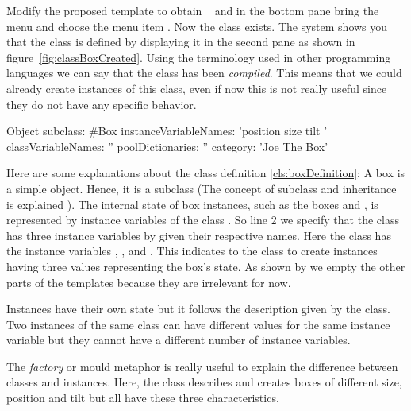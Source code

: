 Modify the proposed template to obtain
~ and in the bottom pane bring the
menu and choose the menu item .  Now the class exists. 
The system shows you that the class is defined by displaying it in the
second pane as shown in figure~\ref{fig:classBoxCreated}.  Using the
terminology used in other programming languages we can say that the
class has been \emph{compiled}.  This means that we could already
create instances of this class, even if now this is not really useful
since they do not have any specific behavior.

\begin{classdef}\label{cls:boxDefinition}
Object subclass: #Box
   instanceVariableNames: 'position size tilt '
   classVariableNames: ''
   poolDictionaries: ''
   category: 'Joe The Box'
\end{classdef}
	
Here are some explanations about the class definition \ref{cls:boxDefinition}: A box is a
simple object.  Hence, it is a subclass 
(The concept of subclass and inheritance is explained
).  The internal state of box instances, such
as the boxes  and , is represented by instance
variables  of the class .  So line 2
we specify that the class  has three instance variables by
given their respective names.  Here the class  has the
instance variables , , and .  This
indicates to the class  to create instances having three
values representing the box's state.  As shown by
 we empty the other parts of the templates
because they are irrelevant for now.





Instances have their own state but it follows the description given by the class. Two instances of the same class can have different values for the same instance variable but they cannot have a different number of instance variables. 

\begin{teacher}
The \emph{factory} or mould metaphor is really useful to explain the difference between classes
and instances. Here, the class  describes and creates boxes of different size, position and tilt but all have these three characteristics.\end{teacher}

